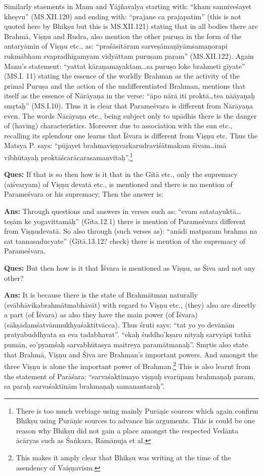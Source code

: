 Similarly staements in Manu and Yājñavalya starting with: “kham sanniveśayet kheṣvu” (MS.XII.120) and ending with: “prajane ca prajapatim” (this is not quoted here by Bhikṣu but this is MS.XII.121) stating that in all bodies there are Brahmā, Viṣṇu and Rudra, also mention the other puruṣa in the form of the antaryāmin of Viṣṇu etc., as: “praśāsitāram sarveṣāmaṇīyāmsamaṇorapi rukmābham svapradhīgamyam vidyāttam puruṣam param” (MS.XII.122). Again Manu’s statement: “yattat kāraṇamayaktam…sa puruṣo loke brahmeti gīyate” (MS.I. 11) stating the essence of the worldly Brahman as the activity of the primal Puruṣa and the action of the undifferentiated Brahman, mentions that itself as the essence of Nārāyaṇa in the verse: “āpo nārā iti proktā…tea nāāyaṇaḥ smṛtaḥ” (MS.I.10). Thus it is clear that Parameśvara is different from Nārāyaṇa even. The words Nārāyaṇa etc., being subject only to upādhis there is the danger of (having) characteristics. Moreover due to association with the sun etc., recalling its splendour one learns that Īśvara is different from Viṣṇu etc. Thus the Matsya P. says: “pūjayet brahmaviṣṇvarkarudraviśātmakam śivam…imā vibhūtayaḥ proktāścarācarasamanvitaḥ”.\footnote{There is too much verbiage using mainly Purāṇic sources which again confirm Bhikṣu using Purāṇic sources to advance his arguments. This is could be one reason why Bhikṣu did not gain a place amongst the respected Vedānta ācāryas such as Śaṅkara, Rāmānuja et al.}

\textbf{Ques:} If that is so then how is it that in the Gītā etc., only the supremacy (aiśvaryam) of Viṣṇu devatā etc., is mentioned and there is no mention of Parameśvara or his supremacy. Then the answer is: 

\textbf{Ans:} Through questions and answers in verses such as: “evam satatayuktā…teṣām ke yogavittamāḥ” (Gīta.12.1) there is mention of Parameśvara different from Viṣṇudevatā. So also through (such verses as): “anādi matparam brahma na sat tannasaducyate” (Gītā.13.12? check) there is mention of the supremacy of Parameśvara.

\textbf{Ques:} But then how is it that Īśvara is mentioned as Viṣṇu, as Śiva and not any other? 

\textbf{Ans:} It is because there is the state of Brahmātman naturally (svābhāvikabrahmātmabhāvāt) with regard to Viṣṇu etc., (they) also are  directly a part (of Īśvara) as also  they have the main power (of Īśvara) (sākṣādamśatvānmukhyaśaktitvācca). Thus śruti says: “tat yo yo devānām pratyabuddhyata sa eva tadabhavat”. “ekaḥ śuddho’kṣaro nityaḥ sarvyāpī tathā pumān, so’pyamśaḥ sarvabhūtasya maitreya paramātmanaḥ”.  Smṛtis also state that Brahmā, Viṣṇu and Śiva are Brahman’s important powers. And amongst the three Viṣṇu is alone the important power of Brahman.\footnote{This makes it amply clear that Bhikṣu was writing at the time of the asendency of Vaiṣṇavism.} This is also learnt from the statement of Parāśara: “sarvaśaktimayo viṣṇuḥ svarūpam brahmaṇaḥ param, sa paraḥ sarvaśaktīnām brahmaṇaḥ samanantaraḥ”.

